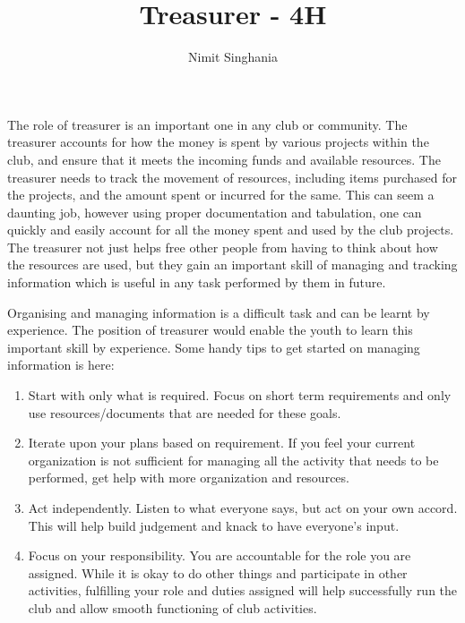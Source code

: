 \documentclass{article}
\title{Treasurer - 4H}
\author{Nimit Singhania}
\begin{document}
\maketitle

The role of treasurer is an important one in any club or community. The treasurer accounts for how the money is spent by various projects within the club, and ensure that it meets the incoming funds and available resources. The treasurer needs to track the movement of resources, including items purchased for the projects, and the amount spent or incurred for the same. This can seem a daunting job, however using proper documentation and tabulation, one can quickly and easily account for all the money spent and used by the club projects. The treasurer not just helps free other people from having to think about how the resources are used, but they gain an important skill of managing and tracking information which is useful in any task performed by them in future.

Organising and managing information is a difficult task and can be learnt by experience. The position of treasurer would enable the youth to learn this important skill by experience. Some handy tips to get started on managing information is here:
\begin{enumerate}
\item Start with only what is required. Focus on short term requirements and only use resources/documents that are needed for these goals.
\item Iterate upon your plans based on requirement. If you feel your current organization is not sufficient for managing all the activity that needs to be performed, get help with more organization and resources.
\item Act independently. Listen to what everyone says, but act on your own accord. This will help build judgement and knack to have everyone's input.
\item Focus on your responsibility. You are accountable for the role you are assigned. While it is okay to do other things and participate in other activities, fulfilling your role and duties assigned will help successfully run the club and allow smooth functioning of club activities.
\end{enumerate}
\end{document}
